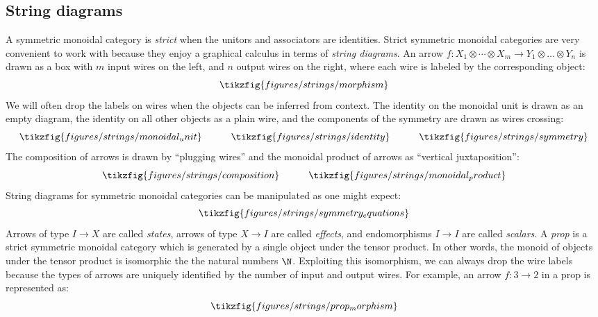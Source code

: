 \subsection{String diagrams}
A symmetric monoidal category is {\em strict} when the unitors and associators are identities.  Strict symmetric monoidal categories are very convenient to work with because they enjoy a graphical calculus in terms of \emph{string
diagrams}.
An arrow \(f : X_1 \otimes \cdots \otimes X_m \to Y_1 \otimes
\dots \otimes Y_n\) is drawn as a box with \(m\) input wires on the left,
and \(n\) output wires on the right, where each wire is labeled by the corresponding object:
\begin{equation}
  \tikzfig{figures/strings/morphism}
\end{equation}
 We will often drop the
labels on wires when the objects can be inferred from context. The identity on the monoidal
unit is drawn as an empty diagram, the identity on all other objects as a plain wire, and the components of the symmetry are drawn as wires crossing:
\begin{equation}
  \tikzfig{figures/strings/monoidal_unit}
  \quad\quad\quad
  \tikzfig{figures/strings/identity}
  \quad\quad\quad
  \tikzfig{figures/strings/symmetry}
\end{equation}
The composition of  arrows is drawn by ``plugging wires'' and the monoidal product of
arrows as ``vertical juxtaposition'':
\begin{equation}
  \tikzfig{figures/strings/composition}
  \quad\quad\quad
  \tikzfig{figures/strings/monoidal_product}
\end{equation}
String diagrams for symmetric monoidal categories can be manipulated as one might expect:
\begin{equation}
  \tikzfig{figures/strings/symmetry_equations}
\end{equation}
Arrows of type \(I\to X\) are called {\em states}, arrows of type \(X\to I\) are called {\em effects}, and endomorphisms \(I\to I\) are called {\em scalars}.
A \emph{prop} is a strict symmetric monoidal category which is generated by a single object under the tensor product.
In other words, the monoid of objects under the tensor product is isomorphic the the natural numbers \(\N\).
Exploiting this isomorphism, we can always drop the wire labels because the types of arrows are uniquely identified by the number of input and output wires. For example,
an arrow \(f : 3 \to 2\) in a prop is represented as:
\begin{equation}
  \tikzfig{figures/strings/prop_morphism}
\end{equation}

